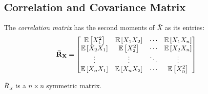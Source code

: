 	\subsection{Correlation and Covariance Matrix} \label{subsec:Correlation and Correlation Matrix}
		\begin{definition}
			The \emph{correlation matrix} has the second moments of $\bar{X}$ as its entries:
			\begin{equation} \label{eq:Correlation Matrix}
				\mathbf{\bar{R}_{X}}
				= \begin{bmatrix}
					\operatorname{\operatorname{\mathbb{E}}} \left[ X_{1}^{2} \right] & \operatorname{\operatorname{\mathbb{E}}} \left[ X_{1}X_{2} \right] & \cdots & \operatorname{\operatorname{\mathbb{E}}} \left[ X_{1}X_{n} \right] \\
					\operatorname{\operatorname{\mathbb{E}}} \left[ X_{2}X_{1} \right] & \operatorname{\operatorname{\mathbb{E}}} \left[ X_{2}^{2} \right] & \cdots & \operatorname{\operatorname{\mathbb{E}}} \left[ X_{2}X_{n} \right] \\
					\vdots & \vdots & \ddots & \vdots \\
					\operatorname{\operatorname{\mathbb{E}}} \left[ X_{n}X_{1} \right] & \operatorname{\operatorname{\mathbb{E}}} \left[ X_{n}X_{2} \right] & \cdots & \operatorname{\operatorname{\mathbb{E}}} \left[ X_{n}^{2} \right] \\
				\end{bmatrix} \\
			\end{equation}
			\begin{remark}
				$\bar{R}_{X}$ is a $n \times n$ symmetric matrix.
			\end{remark}
		\end{definition}

